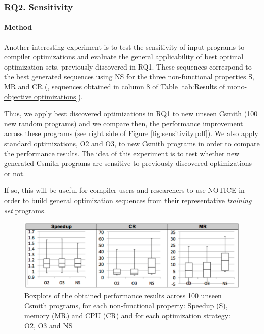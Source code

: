 \noindent{}


\subsubsection{RQ2. Sensitivity}
\paragraph{Method}
Another interesting experiment is to test the sensitivity of input programs to compiler optimizations and evaluate the general applicability of best optimal optimization sets, previously discovered in RQ1. These sequences correspond to the best generated sequences using NS for the three non-functional properties S, MR and CR (\ie, sequences obtained in column 8 of Table \ref{tab:Results of mono-objective optimizations}). 

Thus, we apply best discovered optimizations in RQ1 to new unseen Csmith (100 new random programs) and we compare then, the performance improvement across these programs (see right side of Figure \ref{fig:sensitivity.pdf}). We also apply standard optimizations, O2 and O3, to new Csmith programs in order to compare the performance results.
The idea of this experiment is to test whether new generated Csmith programs are sensitive to previously discovered optimizations or not. 

If so, this will be useful for compiler users and researchers to use NOTICE in order to build general optimization sequences from their representative \textit{training set} programs.

\begin{figure}[h]
	\centering
	\includegraphics[width=1.\linewidth]{chapitre3/fig/box.pdf}
	\caption{Boxplots of the obtained performance results across 100 unseen Csmith programs, for each non-functional property: Speedup (S), memory (MR) and CPU (CR) and for each optimization strategy: O2, O3 and NS}
	\label{fig:box.pdf}
\end{figure}

